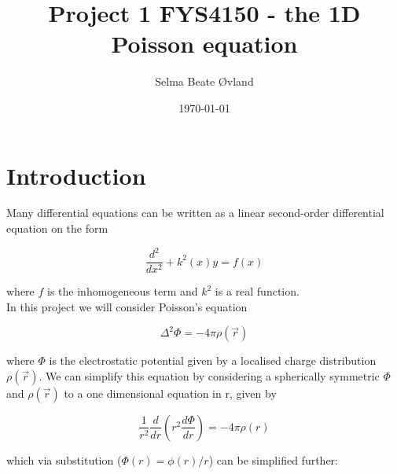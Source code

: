 \documentclass[oneside, final, 11pt, english, twocolumn]{article}
\title{Project 1 FYS4150 - the 1D Poisson equation}%
\author{Selma Beate Øvland}
\date{\today}
\begin{document}



\section{Introduction}

Many differential equations can be written as a linear second-order differential equation on the form

\begin{equation}
\frac{d^2}{dx^2} + k^2(x)y = f(x)
\end{equation}

where $f$ is the inhomogeneous term and $k^2$ is a real function. \\

In this project we will consider Poisson's equation

\begin{equation}
\Delta^2 \Phi = -4\pi \rho (\vec{r})
\end{equation}

where $\Phi$ is the electrostatic potential given by a localised charge distribution $\rho (\vec{r})$. We can simplify this equation by considering a spherically symmetric $\Phi$ and $\rho(\vec{r})$ to a one dimensional equation in r, given by

\begin{equation}
\frac{1}{r^2} \frac{d}{dr} (r^2 \frac{d\Phi}{dr}) = -4 \pi \rho(r)
\end{equation}

which via substitution ($ \Phi(r) = \phi(r)/r$) can be simplified further: 
\end{document}
